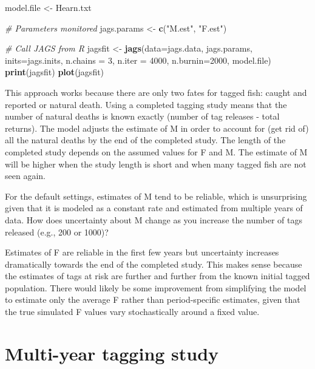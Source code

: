 \documentclass[
]{krantz}
\makeatletter
\newenvironment{Shaded}{\begin{snugshade}}{\end{snugshade}}
\newcommand{\AttributeTok}[1]{\textcolor[rgb]{0.27,0.27,0.27}{#1}}
\newcommand{\CommentTok}[1]{\textcolor[rgb]{0.37,0.37,0.37}{\textit{#1}}}
\newcommand{\DecValTok}[1]{\textcolor[rgb]{0.06,0.06,0.06}{#1}}
\newcommand{\FunctionTok}[1]{\textcolor[rgb]{0.27,0.27,0.27}{\textbf{#1}}}
\newcommand{\NormalTok}[1]{#1}
\newcommand{\OtherTok}[1]{\textcolor[rgb]{0.37,0.37,0.37}{#1}}
\newcommand{\StringTok}[1]{\textcolor[rgb]{0.5,0.5,0.5}{#1}}
\newenvironment{kframe}{%
\medskip{}
\setlength{\fboxsep}{.8em}
 \def\at@end@of@kframe{}%
 \ifinner\ifhmode%
  \def\at@end@of@kframe{\end{minipage}}%
  \begin{minipage}{\columnwidth}%
 \fi\fi%
 \def\FrameCommand##1{\hskip\@totalleftmargin \hskip-\fboxsep
 \colorbox{shadecolor}{##1}\hskip-\fboxsep
     \hskip-\linewidth \hskip-\@totalleftmargin \hskip\columnwidth}%
 \MakeFramed {\advance\hsize-\width
   \@totalleftmargin\z@ \linewidth\hsize
   \@setminipage}}%
 {\par\unskip\endMakeFramed%
 \at@end@of@kframe}
\renewenvironment{Shaded}{\begin{kframe}}{\end{kframe}}
\makeatother
\begin{document}
\begin{Shaded}
\begin{Highlighting}[]
\NormalTok{model.file }\OtherTok{\textless{}{-}} \StringTok{\textquotesingle{}Hearn.txt\textquotesingle{}}

\CommentTok{\# Parameters monitored}
\NormalTok{jags.params }\OtherTok{\textless{}{-}} \FunctionTok{c}\NormalTok{(}\StringTok{"M.est"}\NormalTok{, }\StringTok{"F.est"}\NormalTok{)}

\CommentTok{\# Call JAGS from R}
\NormalTok{jagsfit }\OtherTok{\textless{}{-}} \FunctionTok{jags}\NormalTok{(}\AttributeTok{data=}\NormalTok{jags.data, jags.params, }\AttributeTok{inits=}\NormalTok{jags.inits,}
                \AttributeTok{n.chains =} \DecValTok{3}\NormalTok{, }\AttributeTok{n.iter =} \DecValTok{4000}\NormalTok{, }\AttributeTok{n.burnin=}\DecValTok{2000}\NormalTok{,}
\NormalTok{                model.file)}
\FunctionTok{print}\NormalTok{(jagsfit)}
\FunctionTok{plot}\NormalTok{(jagsfit)}
\end{Highlighting}
\end{Shaded}

This approach works because there are only two fates for tagged fish: caught and reported or natural death. Using a completed tagging study means that the number of natural deaths is known exactly (number of tag releases - total returns). The model adjusts the estimate of M in order to account for (get rid of) all the natural deaths by the end of the completed study. The length of the completed study depends on the assumed values for F and M. The estimate of M will be higher when the study length is short and when many tagged fish are not seen again.

For the default settings, estimates of M tend to be reliable, which is unsurprising given that it is modeled as a constant rate and estimated from multiple years of data. How does uncertainty about M change as you increase the number of tags released (e.g., 200 or 1000)?

Estimates of F are reliable in the first few years but uncertainty increases dramatically towards the end of the completed study. This makes sense because the estimates of tags at risk are further and further from the known initial tagged population. There would likely be some improvement from simplifying the model to estimate only the average F rather than period-specific estimates, given that the true simulated F values vary stochastically around a fixed value.

\hypertarget{BrownieFandM}{%
\section{Multi-year tagging study}\label{BrownieFandM}}
\end{document}
